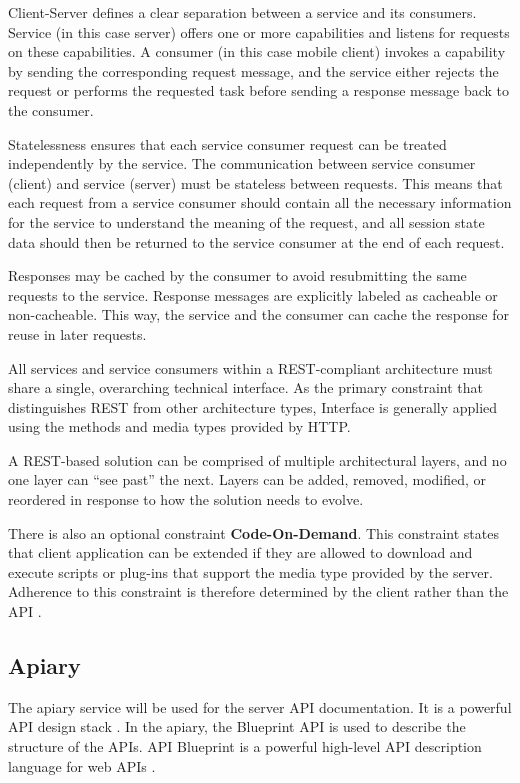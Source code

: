 \begin{itemize}

Client-Server defines a clear separation between a service and its consumers. Service (in this case server) offers one or more capabilities and listens for requests on these capabilities. A consumer (in this case mobile client) invokes a capability by sending the corresponding request message, and the service either rejects the request or performs the requested task before sending a response message back to the consumer.

Statelessness ensures that each service consumer request can be treated independently by the service. The communication between service consumer (client) and service (server) must be stateless between requests. This means that each request from a service consumer should contain all the necessary information for the service to understand the meaning of the request, and all session state data should then be returned to the service consumer at the end of each request.

Responses may be cached by the consumer to avoid resubmitting the same requests to the service. Response messages are explicitly labeled as cacheable or non-cacheable. This way, the service and the consumer can cache the response for reuse in later requests.

All services and service consumers within a REST-compliant architecture must share a single, overarching technical interface. As the primary constraint that distinguishes REST from other architecture types, Interface is generally applied using the methods and media types provided by HTTP.

A REST-based solution can be comprised of multiple architectural layers, and no one layer can ``see past'' the next. Layers can be added, removed, modified, or reordered in response to how the solution needs to evolve.

\end{itemize}

There is also an optional constraint \textbf{Code-On-Demand}. This constraint states that client application can be extended if they are allowed to download and execute scripts or plug-ins that support the media type provided by the server. Adherence to this constraint is therefore determined by the client rather than the API \cite{rest}.
\pagebreak

\subsection{Apiary}
The apiary service will be used for the server API documentation. It is a powerful API design stack \cite{apiary}. In the apiary, the Blueprint API is used to describe the structure of the APIs. API Blueprint is a powerful high-level API description language for web APIs \cite{apiblueprint}.

